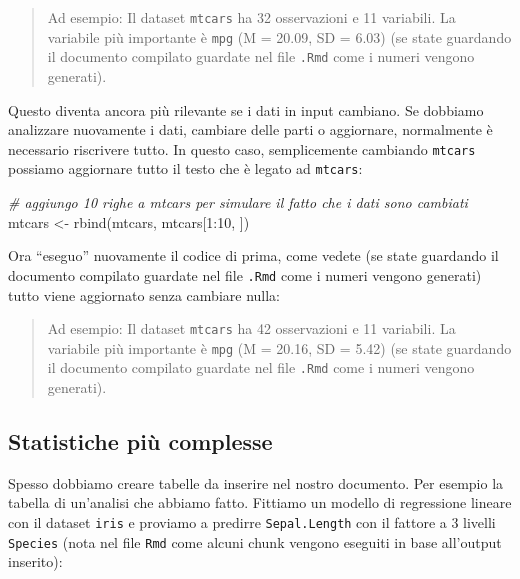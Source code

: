 \documentclass[
]{article}
\newenvironment{Shaded}{\begin{snugshade}}{\end{snugshade}}
\newcommand{\CommentTok}[1]{\textcolor[rgb]{0.56,0.35,0.01}{\textit{#1}}}
\newcommand{\DecValTok}[1]{\textcolor[rgb]{0.00,0.00,0.81}{#1}}
\newcommand{\FunctionTok}[1]{\textcolor[rgb]{0.00,0.00,0.00}{#1}}
\newcommand{\NormalTok}[1]{#1}
\newcommand{\OtherTok}[1]{\textcolor[rgb]{0.56,0.35,0.01}{#1}}
\newcommand{\SpecialCharTok}[1]{\textcolor[rgb]{0.00,0.00,0.00}{#1}}
\begin{document}
\begin{quote}
Ad esempio: Il dataset \texttt{mtcars} ha 32 osservazioni e 11 variabili. La variabile più importante è \texttt{mpg} (M = 20.09, SD = 6.03) (se state guardando il documento compilato guardate nel file \texttt{.Rmd} come i numeri vengono generati).
\end{quote}

Questo diventa ancora più rilevante se i dati in input cambiano. Se dobbiamo analizzare nuovamente i dati, cambiare delle parti o aggiornare, normalmente è necessario riscrivere tutto. In questo caso, semplicemente cambiando \texttt{mtcars} possiamo aggiornare tutto il testo che è legato ad \texttt{mtcars}:

\begin{Shaded}
\begin{Highlighting}[]
\CommentTok{\# aggiungo 10 righe a mtcars per simulare il fatto che i dati sono cambiati}
\NormalTok{mtcars }\OtherTok{\textless{}{-}} \FunctionTok{rbind}\NormalTok{(mtcars, mtcars[}\DecValTok{1}\SpecialCharTok{:}\DecValTok{10}\NormalTok{, ])}
\end{Highlighting}
\end{Shaded}

Ora ``eseguo'' nuovamente il codice di prima, come vedete (se state guardando il documento compilato guardate nel file \texttt{.Rmd} come i numeri vengono generati) tutto viene aggiornato senza cambiare nulla:

\begin{quote}
Ad esempio: Il dataset \texttt{mtcars} ha 42 osservazioni e 11 variabili. La variabile più importante è \texttt{mpg} (M = 20.16, SD = 5.42) (se state guardando il documento compilato guardate nel file \texttt{.Rmd} come i numeri vengono generati).
\end{quote}

\hypertarget{statistiche-piuxf9-complesse}{%
\subsection{Statistiche più complesse}\label{statistiche-piuxf9-complesse}}

Spesso dobbiamo creare tabelle da inserire nel nostro documento. Per esempio la tabella di un'analisi che abbiamo fatto. Fittiamo un modello di regressione lineare con il dataset \texttt{iris} e proviamo a predirre \texttt{Sepal.Length} con il fattore a 3 livelli \texttt{Species} (nota nel file \texttt{Rmd} come alcuni chunk vengono eseguiti in base all'output inserito):
\end{document}
